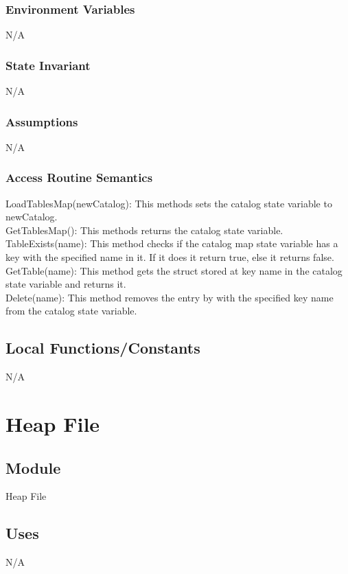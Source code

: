 \documentclass[12pt]{article}
\begin{document}
\subsubsection{Environment Variables}
N/A
\subsubsection{State Invariant}
N/A
\subsubsection{Assumptions}
N/A

\subsubsection{Access Routine Semantics}
\noindent LoadTablesMap(newCatalog): This methods sets the catalog state variable to newCatalog.\\

\noindent GetTablesMap(): This methods returns the catalog state variable.\\

\noindent TableExists(name): This method checks if the catalog map state variable has a key with the specified name in it. If it does it return true, else it returns false.\\

\noindent GetTable(name): This method gets the struct stored at key name in the catalog state variable and returns it.\\

\noindent Delete(name): This method removes the entry by with the specified key name from the catalog state variable.\\

\subsection{Local Functions/Constants}
N/A

\newpage

\section{Heap File}

\subsection{Module}
Heap File

\subsection{Uses}
N/A
\end{document}
